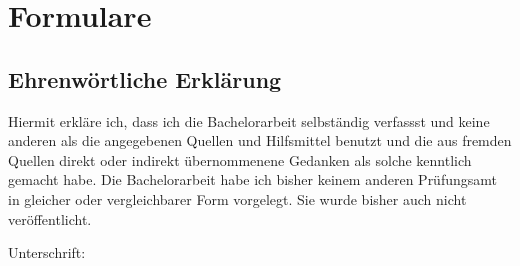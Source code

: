 \section*{Formulare}

\subsection*{Ehrenwörtliche Erklärung}

Hiermit erkläre ich, dass ich die Bachelorarbeit selbständig verfassst und keine anderen als die angegebenen Quellen und Hilfsmittel benutzt und die aus fremden Quellen direkt oder indirekt übernommenene Gedanken als solche kenntlich gemacht habe. Die Bachelorarbeit habe ich bisher keinem anderen Prüfungsamt in gleicher oder vergleichbarer Form vorgelegt. Sie wurde bisher auch nicht veröffentlicht.  

\vskip 2cm

Unterschrift: \hrulefill

\hspace*{0mm}

\newpage